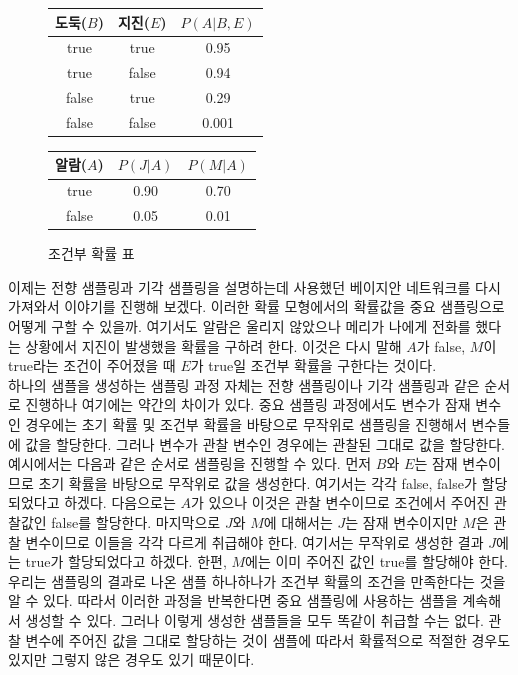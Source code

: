 \documentclass[a4paper]{oblivoir}
\begin{document}
\begin{figure}[ht] \centering 
\parbox[t]{3cm}
{
\begin{tabular}{|c|c|c|}
  \hline
  도둑($B$) & 지진($E$) & $P(A|B,E)$ \\
  \hline
  true & true & 0.95 \\
  \hline
  true & false & 0.94 \\
  \hline
  false & true & 0.29 \\
  \hline
  false & false & 0.001 \\
  \hline
\end{tabular}
} \hspace{3cm}
\parbox[t]{5cm}
{
\begin{tabular}{|c|c|c|}
  \hline
  알람($A$) & $P(J|A)$ & $P(M|A)$ \\
  \hline
  true & 0.90 & 0.70 \\
  \hline
  false & 0.05 & 0.01 \\
  \hline
\end{tabular}
}
\caption{조건부 확률 표}
\label{fig:10-1-1-3}
\end{figure} 

이제는 전향 샘플링과 기각 샘플링을 설명하는데 사용했던 베이지안 네트워크를 다시 가져와서 이야기를 진행해 보겠다. 이러한 확률 모형에서의 확률값을 중요 샘플링으로 어떻게 구할 수 있을까. 여기서도 알람은 울리지 않았으나 메리가 나에게 전화를 했다는 상황에서 지진이 발생했을 확률을 구하려 한다. 이것은 다시 말해 $A$가 false, $M$이 true라는 조건이 주어졌을 때 $E$가 true일 조건부 확률을 구한다는 것이다. \\

하나의 샘플을 생성하는 샘플링 과정 자체는 전향 샘플링이나 기각 샘플링과 같은 순서로 진행하나 여기에는 약간의 차이가 있다. 중요 샘플링 과정에서도 변수가 잠재 변수인 경우에는 초기 확률 및 조건부 확률을 바탕으로 무작위로 샘플링을 진행해서 변수들에 값을 할당한다. 그러나 변수가 관찰 변수인 경우에는 관찰된 그대로 값을 할당한다. 예시에서는 다음과 같은 순서로 샘플링을 진행할 수 있다. 먼저 $B$와 $E$는 잠재 변수이므로 초기 확률을 바탕으로 무작위로 값을 생성한다. 여기서는 각각 false, false가 할당되었다고 하겠다. 다음으로는 $A$가 있으나 이것은 관찰 변수이므로 조건에서 주어진 관찰값인 false를 할당한다. 마지막으로 $J$와 $M$에 대해서는 $J$는 잠재 변수이지만 $M$은 관찰 변수이므로 이들을 각각 다르게 취급해야 한다. 여기서는 무작위로 생성한 결과 $J$에는 true가 할당되었다고 하겠다. 한편, $M$에는 이미 주어진 값인 true를 할당해야 한다. 우리는 샘플링의 결과로 나온 샘플 하나하나가 조건부 확률의 조건을 만족한다는 것을 알 수 있다. 따라서 이러한 과정을 반복한다면 중요 샘플링에 사용하는 샘플을 계속해서 생성할 수 있다. 그러나 이렇게 생성한 샘플들을 모두 똑같이 취급할 수는 없다. 관찰 변수에 주어진 값을 그대로 할당하는 것이 샘플에 따라서 확률적으로 적절한 경우도 있지만 그렇지 않은 경우도 있기 때문이다. \\
\end{document}
